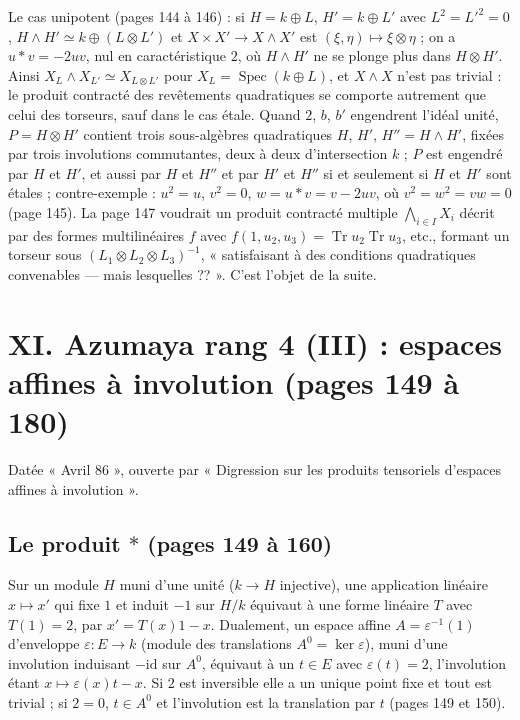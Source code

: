 \documentclass[11pt,a4paper]{article}
\begin{document}
Le cas unipotent (pages 144 à 146) : si $H = k \oplus L$, $H' = k \oplus L'$
avec $L^2 = L'^2 = 0$, $H \wedge H' \simeq k \oplus (L \otimes L')$ et $X \times
X' \to X \wedge X'$ est $(\xi, \eta) \mapsto \xi \otimes \eta$ ; on a $u * v =
-2uv$, nul en caractéristique $2$, où $H \wedge H'$ ne se plonge plus dans $H
\otimes H'$. Ainsi $X_L \wedge X_{L'} \simeq X_{L \otimes L'}$ pour $X_L =
\operatorname{Spec}(k \oplus L)$, et $X \wedge X$ n'est pas trivial : le
produit contracté des revêtements quadratiques se comporte autrement que celui
des torseurs, sauf dans le cas étale. Quand $2$, $b$, $b'$ engendrent l'idéal
unité, $P = H \otimes H'$ contient trois sous-algèbres quadratiques $H$, $H'$,
$H'' = H \wedge H'$, fixées par trois involutions commutantes, deux à deux
d'intersection $k$ ; $P$ est engendré par $H$ et $H'$, et aussi par $H$ et
$H''$ et par $H'$ et $H''$ si et seulement si $H$ et $H'$ sont étales ; contre-exemple :
$u^2 = u$, $v^2 = 0$, $w = u * v = v - 2uv$, où $v^2 = w^2 = vw = 0$ (page 145).
La page 147 voudrait un produit contracté multiple $\bigwedge_{i \in I} X_i$
décrit par des formes multilinéaires $f$ avec $f(1, u_2, u_3) =
\operatorname{Tr}u_2\operatorname{Tr}u_3$, etc., formant un torseur sous $(L_1
\otimes L_2 \otimes L_3)^{-1}$, « satisfaisant à des conditions quadratiques
convenables — mais lesquelles ?? ». C'est l'objet de la suite.

\section*{XI. Azumaya rang 4 (III) : espaces affines à involution (pages 149 à 180)}

Datée « Avril 86 », ouverte par « Digression sur les produits tensoriels
d'espaces affines à involution ».

\subsection*{Le produit $*$ (pages 149 à 160)}

Sur un module $H$ muni d'une unité ($k \to H$ injective), une application
linéaire $x \mapsto x'$ qui fixe $1$ et induit $-1$ sur $H/k$ équivaut à une
forme linéaire $T$ avec $T(1) = 2$, par $x' = T(x)1 - x$. Dualement, un espace
affine $A = \varepsilon^{-1}(1)$ d'enveloppe $\varepsilon : E \to k$ (module des
translations $A^0 = \ker\varepsilon$), muni d'une involution induisant
$-\mathrm{id}$ sur $A^0$, équivaut à un $t \in E$ avec $\varepsilon(t) = 2$,
l'involution étant $x \mapsto \varepsilon(x)t - x$. Si $2$ est inversible elle a
un unique point fixe et tout est trivial ; si $2 = 0$, $t \in A^0$ et
l'involution est la translation par $t$ (pages 149 et 150).
\end{document}
